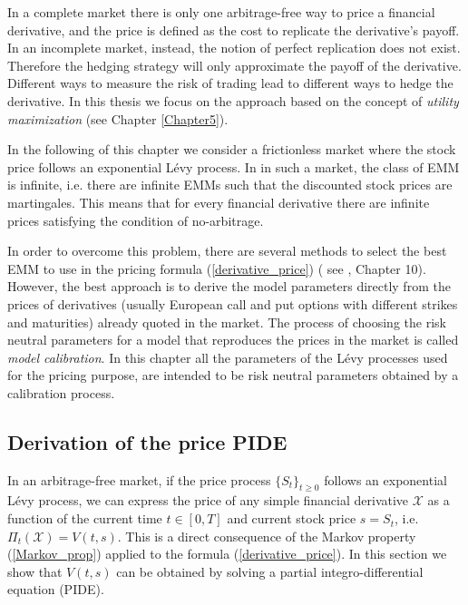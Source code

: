 In a complete market there is only one arbitrage-free way to price a financial derivative, and the price is defined as the cost to replicate the derivative's payoff.
In an incomplete market, instead, the notion of perfect replication does not exist. 
Therefore the hedging strategy will only approximate the payoff of the derivative. Different ways to measure the risk of trading lead to different 
ways to hedge the derivative. In this thesis we focus on the approach based on the concept of \emph{utility maximization} (see Chapter \ref{Chapter5}).

In the following of this chapter we consider a frictionless market where the stock price follows an exponential Lévy process. 
In in such a market, the class of EMM is infinite, 
i.e. there are infinite EMMs such that the discounted stock prices are martingales.
This means that for every financial derivative there are infinite prices satisfying the condition of no-arbitrage. 

In order to overcome this problem, there are several methods to select the best EMM to use in the pricing formula (\ref{derivative_price}) (
see \cite{Cont}, Chapter 10).
However, the best approach is to derive the model parameters directly from the prices of derivatives (usually European call and put options with different strikes and maturities) 
already quoted in the market.
The process of choosing the risk neutral parameters for a model that reproduces the prices in the market is called \emph{model calibration}.
In this chapter all the parameters of the Lévy processes used for the pricing purpose, are intended to be risk neutral parameters obtained by a calibration process.





\subsection{Derivation of the price PIDE}

In an arbitrage-free market, if the price process $\{S_t\}_{t\geq0}$ follows an exponential Lévy process, 
we can express the price of any simple financial derivative $\mathcal{X}$ as a function of the current time 
$t \in [0,T]$ and current stock price $s=S_t$, i.e. $\Pi_t(\mathcal{X}) = V(t,s)$.
This is a direct consequence of the Markov property (\ref{Markov_prop}) applied to the formula (\ref{derivative_price}).
In this section we show that $V(t,s)$ can be obtained by solving a partial integro-differential equation (PIDE).

